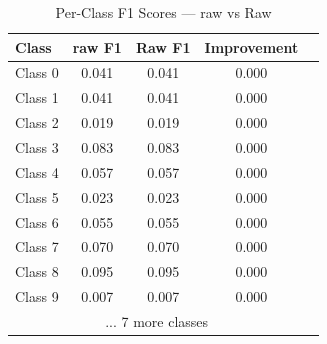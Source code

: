 \begin{table}[htbp]
\centering
\caption{Per-Class F1 Scores — raw vs Raw}
\label{tab:perclass_f1}
\begin{tabular}{lcccc}
\toprule
Class & raw F1 & Raw F1 & Improvement \\
\midrule
Class 0 & 0.041 & 0.041 & 0.000 \\
Class 1 & 0.041 & 0.041 & 0.000 \\
Class 2 & 0.019 & 0.019 & 0.000 \\
Class 3 & 0.083 & 0.083 & 0.000 \\
Class 4 & 0.057 & 0.057 & 0.000 \\
Class 5 & 0.023 & 0.023 & 0.000 \\
Class 6 & 0.055 & 0.055 & 0.000 \\
Class 7 & 0.070 & 0.070 & 0.000 \\
Class 8 & 0.095 & 0.095 & 0.000 \\
Class 9 & 0.007 & 0.007 & 0.000 \\
\midrule
\multicolumn{4}{c}{... 7 more classes} \\
\bottomrule
\end{tabular}
\end{table}